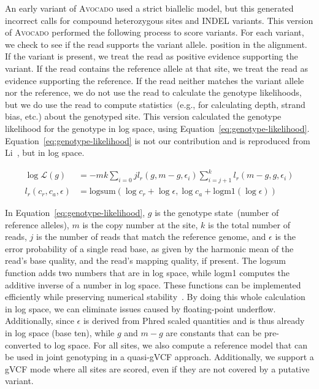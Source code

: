 \documentclass[phd]{ucbthesis}
\begin{document}
An early variant of \textsc{Avocado} used a strict biallelic model, but this
generated incorrect calls for compound heterozygous sites and INDEL variants.
This version of \textsc{Avocado} performed the following process to score variants.
For each variant, we check to see if the read supports the variant allele.
position in the alignment. If the variant is present, we treat the read as positive
evidence supporting the variant. If the read contains the reference allele at
that site, we treat the read as evidence supporting the reference. If the read
neither matches the variant allele nor the reference, we do not use the read
to calculate the genotype likelihoods, but we do use the read to compute
statistics~(e.g., for calculating depth, strand bias, etc.) about the genotyped
site. This version calculated the genotype likelihood for the genotype in log space,
using Equation~\eqref{eq:genotype-likelihood}. Equation~\eqref{eq:genotype-likelihood}
is not our contribution and is reproduced from Li~\cite{li11}, but in log space.

\begin{align}
\label{eq:genotype-likelihood}
\log \mathcal{L}(g) &= -m k \sum_{i = 0}{j} l_r(g, m - g, \epsilon_i) \sum_{i = j + 1}^k l_r(m - g, g, \epsilon_i) \\
l_r(c_r, c_a, \epsilon) &= \text{logsum}(\log c_r + \log \epsilon, \log c_a + \text{logm1}(\log \epsilon))
\end{align}

In Equation~\eqref{eq:genotype-likelihood}, $g$ is the genotype state~(number of
reference alleles), $m$ is the copy number at the site, $k$ is the total number of
reads, $j$ is the number of reads that match the reference genome, and $\epsilon$
is the error probability of a single read base, as given by the harmonic mean of the
read's base quality, and the read's mapping quality, if present. The logsum function
adds two numbers that are in log space, while logm1 computes the additive inverse of
a number in log space. These functions can be implemented efficiently while preserving
numerical stability~\cite{durbin98}. By doing this whole calculation in log space,
we can eliminate issues caused by floating-point underflow. Additionally, since
$\epsilon$ is derived from Phred scaled quantities and is thus already in log
space (base ten), while $g$ and $m - g$ are constants that can be pre-converted to
log space. For all sites, we also compute a reference model that can be used in
joint genotyping in a quasi-gVCF approach. Additionally, we support a gVCF mode where
all sites are scored, even if they are not covered by a putative variant.
\end{document}
